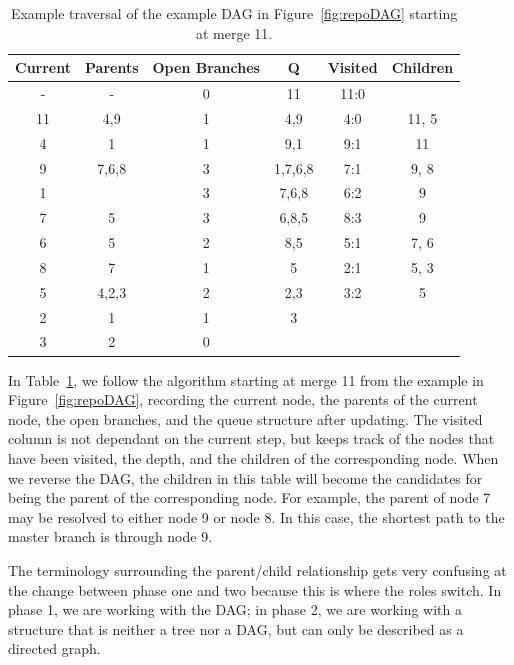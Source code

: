 \begin{table}[htpb]
  \centering
  \caption{Example traversal of the example DAG in
    Figure~\ref{fig:repoDAG} starting at merge 11.}
  \label{tab:ex_traversal}
  \begin{tabular}{cccc|cc}
    \toprule
    Current & Parents & Open Branches & Q       & Visited & Children\\\midrule
    -       & -       & 0             & 11      & 11:0    & \\
    11      & 4,9     & 1             & 4,9     & 4:0     & 11, 5\\
    4       & 1       & 1             & 9,1     & 9:1     & 11\\
    9       & 7,6,8   & 3             & 1,7,6,8 & 7:1     & 9, 8\\
    1       &         & 3             & 7,6,8   & 6:2     & 9\\
    7       & 5       & 3             & 6,8,5   & 8:3     & 9\\
    6       & 5       & 2             & 8,5     & 5:1     & 7, 6\\
    8       & 7       & 1             & 5       & 2:1     & 5, 3\\
    5       & 4,2,3   & 2             & 2,3     & 3:2     & 5\\
    2       & 1       & 1             & 3       &         & \\
    3       & 2       & 0             &         &         & \\
    \bottomrule
  \end{tabular}
\end{table}

In Table~\ref{tab:ex_traversal}, we follow the algorithm starting at
merge 11 from the example in Figure~\ref{fig:repoDAG}, recording the
current node, the parents of the current node, the open branches, and
the queue structure after updating. The visited column is not dependant
on the current step, but keeps track of the nodes that have been
visited, the depth, and the children of the corresponding node. When we
reverse the DAG, the children in this table will become the candidates
for being the parent of the corresponding node. For example, the parent
of node 7 may be resolved to either node 9 or node 8. In this case, the
shortest path to the master branch is through node 9.

The terminology surrounding the parent/child relationship gets very
confusing at the change between phase one and two because this is where
the roles switch. In phase 1, we are working with the DAG; in phase 2,
we are working with a structure that is neither a tree nor a DAG, but
can only be described as a directed graph.


